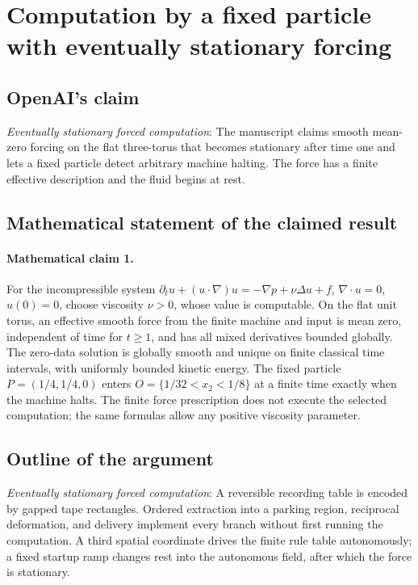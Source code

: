 \documentclass[11pt]{article}
\begin{document}
\section*{Computation by a fixed particle with eventually stationary forcing}

\subsection{OpenAI's claim}
\textit{Eventually stationary forced computation}: The manuscript claims smooth mean-zero forcing on the flat three-torus that becomes stationary after time one and lets a fixed particle detect arbitrary machine halting. The force has a finite effective description and the fluid begins at rest.

\subsection{Mathematical statement of the claimed result}
\paragraph{Mathematical claim 1.} For the incompressible system $\partial_tu+(u\cdot\nabla)u=-\nabla p+\nu\Delta u+f$, $\nabla\cdot u=0$, $u(0)=0$, choose viscosity $\nu>0$, whose value is computable. On the flat unit torus, an effective smooth force from the finite machine and input is mean zero, independent of time for $t\ge1$, and has all mixed derivatives bounded globally. The zero-data solution is globally smooth and unique on finite classical time intervals, with uniformly bounded kinetic energy. The fixed particle $P=(1/4,1/4,0)$ enters $O=\{1/32<x_2<1/8\}$ at a finite time exactly when the machine halts. The finite force prescription does not execute the selected computation; the same formulas allow any positive viscosity parameter.

\subsection{Outline of the argument}
\textit{Eventually stationary forced computation}: A reversible recording table is encoded by gapped tape rectangles. Ordered extraction into a parking region, reciprocal deformation, and delivery implement every branch without first running the computation. A third spatial coordinate drives the finite rule table autonomously; a fixed startup ramp changes rest into the autonomous field, after which the force is stationary.
\end{document}
